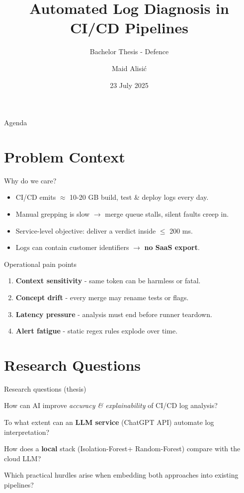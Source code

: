 \documentclass[14pt,aspectratio=169,draft]{beamer}
\title{Automated Log Diagnosis in CI/CD Pipelines}
\subtitle{Bachelor Thesis - Defence}
\author{Maid Alisi\'c}
\institute{University of Applied Sciences Upper Austria}
\date{23 July 2025}
\newcommand{\IForest}{Isolation-Forest\xspace}
\newcommand{\RForest}{Random-Forest\xspace}
\begin{document}

\maketitle

\begin{frame}{Agenda}
\tableofcontents[
  hideallsubsections,
  sections={1,...,9}
]
\end{frame}

\section{Problem Context}
\begin{frame}{Why do we care?}
\begin{itemize}[<+->]
  \item CI/CD emits \alert{$\approx$ 10-20 GB} build, test \& deploy logs every day.
  \item Manual grepping is slow $\xrightarrow{}$ merge queue stalls, silent faults creep in.
  \item Service-level objective: deliver a verdict inside \alert{ $\leq$ 200 ms}.
  \item Logs can contain customer identifiers $\xrightarrow{}$ \textbf{no SaaS export}.
\end{itemize}
\end{frame}

\begin{frame}{Operational pain points}
\begin{enumerate}[<+->]
  \item \textbf{Context sensitivity} - same token can be harmless or fatal.
  \item \textbf{Concept drift} - every merge may rename tests or flags.
  \item \textbf{Latency pressure} - analysis must end before runner teardown.
  \item \textbf{Alert fatigue} - static regex rules explode over time.
\end{enumerate}
\end{frame}

\section{Research Questions}
\begin{frame}{Research questions (thesis)}
\begin{description}[<+->]
  \item[RQ\textsubscript{main}] How can AI improve \emph{accuracy \& explainability} of CI/CD log analysis?
  \item[RQ1] To what extent can an \textbf{LLM service} (ChatGPT API) automate log interpretation?
  \item[RQ2] How does a \textbf{local} stack (\IForest + \RForest) compare with the cloud LLM?
  \item[RQ3] Which practical hurdles arise when embedding both approaches into existing pipelines?
\end{description}
\end{frame}
\end{document}
